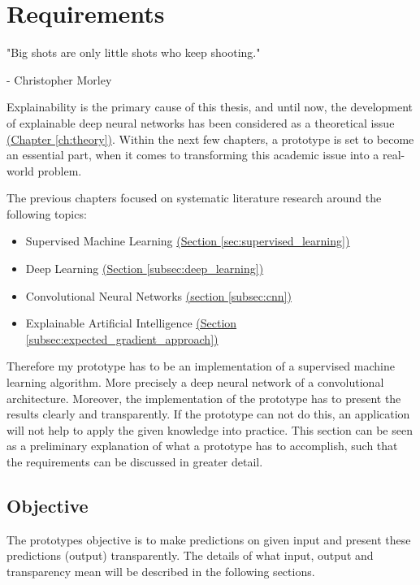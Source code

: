 
\chapter{Requirements}\label{ch:requirements}
\epigraph{"Big shots are only little shots who keep shooting."}{- Christopher Morley}

Explainability is the primary cause of this thesis, and until now, the development of explainable deep neural networks has been considered as a theoretical issue \hyperref[ch:theory]{(Chapter \ref{ch:theory})}. Within the next few chapters, a prototype is set to become an essential part, when it comes to transforming this academic issue into a real-world problem. 

The previous chapters focused on systematic literature research around the following topics:  
\begin{itemize}
	\item Supervised Machine Learning \hyperref[sec:supervised_learning]{(Section \ref{sec:supervised_learning})}
	\item Deep Learning \hyperref[subsec:deep_learning]{(Section \ref{subsec:deep_learning})}
	\item Convolutional Neural Networks \hyperref[subsec:cnn]{(section \ref{subsec:cnn})}
	\item Explainable Artificial Intelligence \hyperref[subsec:expected_gradient_approach]{ (Section \ref{subsec:expected_gradient_approach})}
\end{itemize}

Therefore my prototype has to be an implementation of a supervised machine learning algorithm. More precisely a deep neural network of a convolutional architecture. Moreover, the implementation of the prototype has to present the results clearly and transparently. If the prototype can not do this, an application will not help to apply the given knowledge into practice. This section can be seen as a preliminary explanation of what a prototype has to accomplish, such that the requirements can be discussed in greater detail. 

\section{Objective}

The prototypes objective is to make predictions on given input and present these predictions (output) transparently. The details of what input, output and transparency mean will be described in the following sections.


